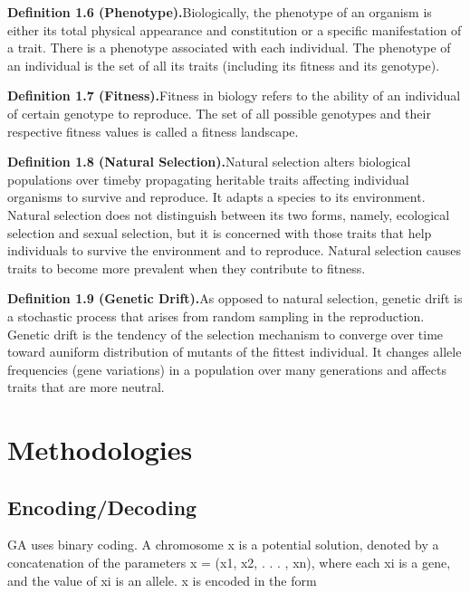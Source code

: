 \documentclass[14pt]{article}
\numberwithin{equation}{subsection}
\begin{document}
		\noindent \textbf{Definition 1.6 (Phenotype).}Biologically, the phenotype of an organism is either its total
		physical appearance and constitution or a specific manifestation of a trait. There is a phenotype associated
		with each individual. The phenotype of an individual is the set of all its traits (including its fitness and
		its genotype). \vspace{2mm}
		
		\noindent \textbf{Definition 1.7 (Fitness).}Fitness in biology refers to the ability of an individual of
		certain genotype to reproduce. The set of all possible genotypes and their respective fitness values is called
		a fitness landscape. \vspace{2mm}
		
		\noindent \textbf{Definition 1.8 (Natural Selection).}Natural selection alters biological populations over
		timeby propagating heritable traits affecting individual organisms to survive and reproduce. It adapts a
		species to its environment. Natural selection does not distinguish between its two forms, namely, ecological
		selection and sexual selection, but it is concerned with those traits that help individuals to survive the
		environment and to reproduce. Natural selection causes traits to become more prevalent when they contribute to
		fitness. \vspace{2mm}
		
		\noindent \textbf{Definition 1.9 (Genetic Drift).}As opposed to natural selection, genetic drift is a
		stochastic process that arises from random sampling in the reproduction. Genetic drift is the tendency of the
		selection mechanism to converge over time toward auniform distribution of mutants of the fittest individual. It
		changes allele frequencies (gene variations) in a population over many generations and affects traits that are
		more neutral. \vspace{2mm}
		
	\section{Methodologies}
		\subsection{Encoding/Decoding}
		GA uses binary coding. A chromosome x is a potential solution, denoted by a concatenation of the parameters
		x = (x1, x2, . . . , xn), where each xi is a gene, and the value of xi is an allele. x is encoded in the form
		
\end{document}

